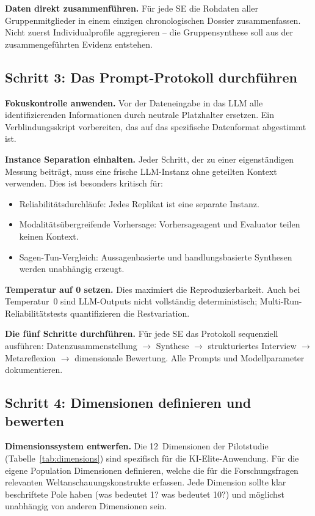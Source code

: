\documentclass[11pt,a4paper]{article}
\begin{document}
\textbf{Daten direkt zusammenführen.} Für jede SE die Rohdaten aller Gruppenmitglieder in einem einzigen chronologischen Dossier zusammenfassen. Nicht zuerst Individualprofile aggregieren -- die Gruppensynthese soll aus der zusammengeführten Evidenz entstehen.

\subsection{Schritt 3: Das Prompt-Protokoll durchführen}
\label{sec:app:step3}

\textbf{Fokuskontrolle anwenden.} Vor der Dateneingabe in das LLM alle identifizierenden Informationen durch neutrale Platzhalter ersetzen. Ein Verblindungsskript vorbereiten, das auf das spezifische Datenformat abgestimmt ist.

\textbf{Instance Separation einhalten.} Jeder Schritt, der zu einer eigenständigen Messung beiträgt, muss eine frische LLM-Instanz ohne geteilten Kontext verwenden. Dies ist besonders kritisch für:
\begin{itemize}[nosep]
  \item Reliabilitätsdurchläufe: Jedes Replikat ist eine separate Instanz.
  \item Modalitätsübergreifende Vorhersage: Vorhersageagent und Evaluator teilen keinen Kontext.
  \item Sagen-Tun-Vergleich: Aussagenbasierte und handlungsbasierte Synthesen werden unabhängig erzeugt.
\end{itemize}

\textbf{Temperatur auf 0 setzen.} Dies maximiert die Reproduzierbarkeit. Auch bei Temperatur~0 sind LLM-Outputs nicht vollständig deterministisch; Multi-Run-Reliabilitätstests quantifizieren die Restvariation.

\textbf{Die fünf Schritte durchführen.} Für jede SE das Protokoll sequenziell ausführen: Datenzusammenstellung $\to$ Synthese $\to$ strukturiertes Interview $\to$ Metareflexion $\to$ dimensionale Bewertung. Alle Prompts und Modellparameter dokumentieren.

\subsection{Schritt 4: Dimensionen definieren und bewerten}
\label{sec:app:step4}

\textbf{Dimensionssystem entwerfen.} Die 12~Dimensionen der Pilotstudie (Tabelle~\ref{tab:dimensions}) sind spezifisch für die KI-Elite-Anwendung. Für die eigene Population Dimensionen definieren, welche die für die Forschungsfragen relevanten Weltanschauungskonstrukte erfassen. Jede Dimension sollte klar beschriftete Pole haben (was bedeutet 1? was bedeutet 10?) und möglichst unabhängig von anderen Dimensionen sein.
\end{document}
